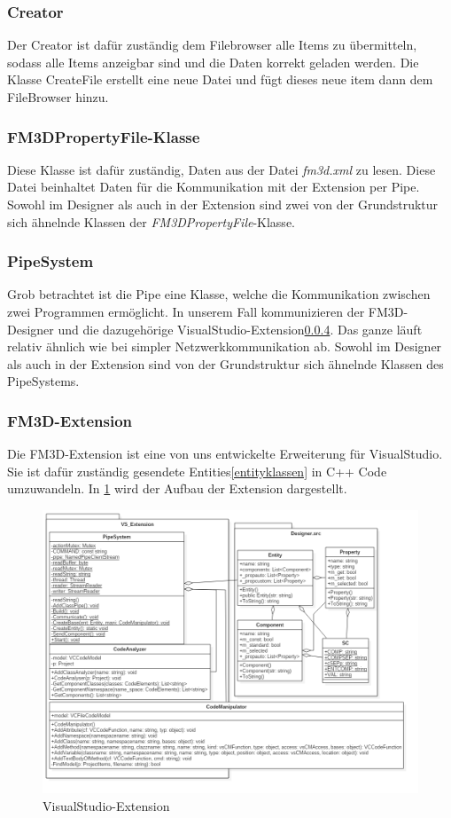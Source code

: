 \subsubsection{Creator}
Der Creator ist dafür zuständig dem Filebrowser alle Items zu übermitteln, sodass alle Items anzeigbar sind und die Daten korrekt geladen werden. Die Klasse CreateFile erstellt eine neue Datei und fügt dieses neue item dann dem FileBrowser hinzu.

\subsubsection{FM3DPropertyFile-Klasse}
Diese Klasse ist dafür zuständig, Daten aus der Datei \textit{fm3d.xml} zu lesen. Diese Datei beinhaltet Daten für die Kommunikation mit der Extension per Pipe. Sowohl im Designer als auch in der Extension sind zwei von der Grundstruktur sich ähnelnde Klassen der \textit{FM3DPropertyFile}-Klasse.

\subsubsection{PipeSystem} 
\label{pipe}
Grob betrachtet ist die Pipe eine Klasse, welche die Kommunikation zwischen zwei Programmen ermöglicht. In unserem Fall kommunizieren der FM3D-Designer und die dazugehörige VisualStudio-Extension\ref{extension}. Das ganze läuft relativ ähnlich wie bei simpler Netzwerkkommunikation ab. 
Sowohl im Designer als auch in der Extension sind von der Grundstruktur sich ähnelnde Klassen des PipeSystems.

\subsubsection{FM3D-Extension}
\label{extension}
Die FM3D-Extension ist eine von uns entwickelte Erweiterung für VisualStudio. Sie ist dafür zuständig gesendete Entities\ref{entityklassen} in C++ Code umzuwandeln. In \cref{vsextensiondia} wird der Aufbau der Extension dargestellt.
\begin{figure}
	\begin{center}
		\includegraphics[width=\textwidth]{03unserprogramm/Designer/VSExtension.png}
		\caption{VisualStudio-Extension}\label{vsextensiondia}
	\end{center}
\end{figure}